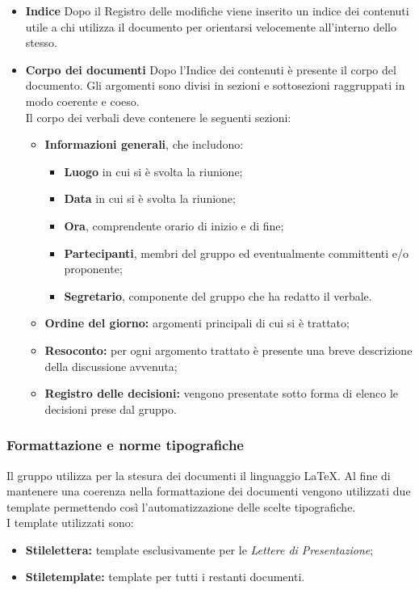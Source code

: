 \begin{itemize}
\item\textbf{Indice}
Dopo il Registro delle modifiche viene inserito un indice dei contenuti utile a chi utilizza il documento per orientarsi velocemente all'interno dello stesso.

\item\textbf{Corpo dei documenti}
Dopo l'Indice dei contenuti è presente il corpo del documento. Gli argomenti sono divisi in sezioni e sottosezioni raggruppati in modo coerente e coeso.\\
Il corpo dei verbali deve contenere le seguenti sezioni:
\begin{itemize}
	\item \textbf{Informazioni generali}, che includono:
		\begin{itemize}
			\item \textbf{Luogo} in cui si è svolta la riunione;
			\item \textbf{Data} in cui si è svolta la riunione;
			\item \textbf{Ora}, comprendente orario di inizio e di fine;
			\item \textbf{Partecipanti}, membri del gruppo ed eventualmente committenti e/o proponente;
			\item \textbf{Segretario}, componente del gruppo che ha redatto il verbale.
		\end{itemize}
	\item \textbf{Ordine del giorno:} argomenti principali di cui si è trattato;
	\item \textbf{Resoconto:} per ogni argomento trattato è presente una breve descrizione della discussione avvenuta;
	\item \textbf{Registro delle decisioni:} vengono presentate sotto forma di elenco le decisioni prese dal gruppo.
\end{itemize}
\end{itemize}

\subsubsection{Formattazione e norme tipografiche}
Il gruppo utilizza per la stesura dei documenti il linguaggio \LaTeX. Al fine di mantenere una coerenza nella formattazione dei documenti vengono utilizzati due template permettendo così l'automatizzazione delle scelte tipografiche.\\
I template utilizzati sono:
\begin{itemize}
	\item \textbf{Stilelettera:} template esclusivamente per le \textit{Lettere di Presentazione};
	\item \textbf{Stiletemplate:} template per tutti i restanti documenti.
\end{itemize}

